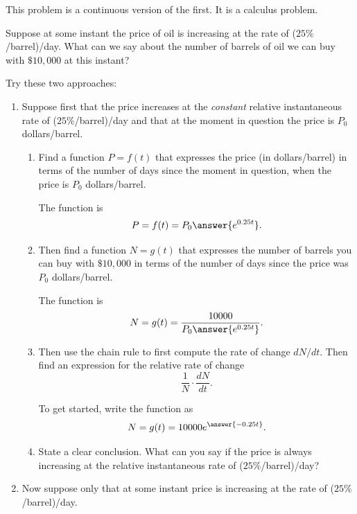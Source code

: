 \documentclass{ximera}
\begin{document}
\begin{question} \label{Qpdf30001}
This problem is a continuous version of the first. It is a calculus problem.

Suppose at some instant the price of oil is increasing at the rate of ($25\%$/barrel)/day. What can we say about the number of barrels of oil we can buy with $\$10,000$ at this instant?

Try these two approaches:

\begin{enumerate}
\item Suppose first that the price increases at the \emph{constant} relative instantaneous rate of ($25\%$/barrel)/day and that at the moment in question the price is $P_0$ dollars/barrel. 

\begin{enumerate}
\item Find a function $P=f(t)$ that expresses the price (in dollars/barrel) in terms of the number of days since the moment in question, when the price is $P_0$ dollars/barrel.

The function is
\[
     P = f(t) = P_0\answer{e^{0.25t}}.
\]

\item Then find a function $N=g(t)$ that expresses the number of barrels you can buy with $\$10,000$ in terms of the number of days since the price was $P_0$ dollars/barrel.

The function is
\[
   N = g(t) = \frac{10000}{P_0 \answer{e^{0.25t}}}.
\]

\item Then use the chain rule to first compute the rate of change $dN/dt$. Then find an expression for the relative rate of change
\[
   \frac{1}{N} \cdot \frac{dN}{dt}.
\] 

To get started, write the function as
\[
   N = g(t) = 10000 e^{\answer{-0.25t}}.
\]

\item State a clear conclusion. What can you say if the price is always increasing at the relative instantaneous rate of ($25\%$/barrel)/day?

\begin{freeResponse}
\end{freeResponse}

\end{enumerate}

\item Now suppose only that at some instant price is increasing at the rate of ($25\%$/barrel)/day. 


\end{enumerate}
\end{question}
\end{document}
